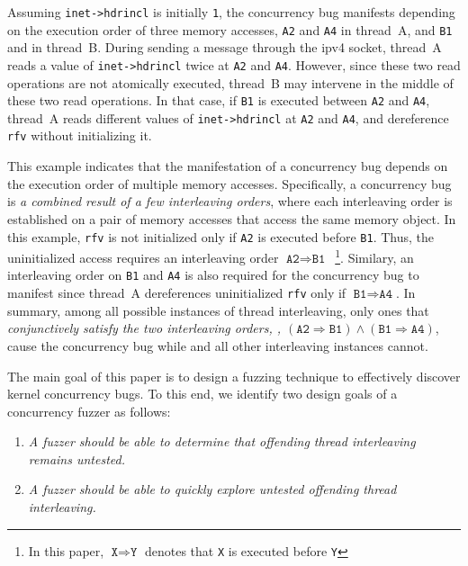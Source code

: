 Assuming \texttt{inet->hdrincl} is initially \texttt{1}, the
concurrency bug manifests depending on the execution order of three
memory accesses, \texttt{A2} and \texttt{A4} in thread~A, and
\texttt{B1} and in thread~B.
%
During sending a message through the ipv4 socket, thread~A reads a
value of \texttt{inet->hdrincl} twice at \texttt{A2} and \texttt{A4}.
%
However, since these two read operations are not atomically executed,
thread~B may intervene in the middle of these two read operations.
%
In that case, if \texttt{B1} is executed between \texttt{A2} and
\texttt{A4}, thread~A reads different values of \texttt{inet->hdrincl}
at \texttt{A2} and \texttt{A4}, and dereference \texttt{rfv} without
initializing it.


This example indicates that the manifestation of a concurrency bug
depends on the execution order of multiple memory
accesses. Specifically, a concurrency bug is \textit{a combined result
  of a few interleaving orders}, where each interleaving order is
established on a pair of memory accesses that access the same memory
object.
%
In this example, \texttt{rfv} is not initialized only if \texttt{A2}
is executed before \texttt{B1}. Thus, the uninitialized access
requires an interleaving order
$\texttt{A2} \Rightarrow \texttt{B1}$~\footnote{In this paper,
  $\texttt{X} \Rightarrow \texttt{Y}$ denotes that \texttt{X} is
  executed before \texttt{Y}}.
%
Similary, an interleaving order on \texttt{B1} and \texttt{A4} is also
required for the concurrency bug to manifest since thread~A
dereferences uninitialized \texttt{rfv} only if
$\texttt{B1} \Rightarrow \texttt{A4}$.
%
In summary, among all possible instances of thread interleaving, only
ones that \textit{conjunctively satisfy the two interleaving orders,
  \ie,
  $(\texttt{A2} \Rightarrow \texttt{B1}) \wedge (\texttt{B1}
  \Rightarrow \texttt{A4})$}, cause the concurrency bug while and all
other interleaving instances cannot.

%
The main goal of this paper is to design a fuzzing technique to
effectively discover kernel concurrency bugs. To this end, we identify
two design goals of a concurrency fuzzer as follows:

\vspace{0.4em}
\begin{enumerate}[label=\textbf{R\arabic*:}]
%
\item \emph{A fuzzer should be able to determine that offending
  thread interleaving remains untested.}
\item \emph{A fuzzer should be able to quickly explore untested
    offending thread interleaving.}
%
\end{enumerate}

